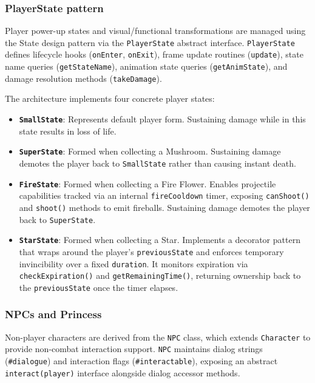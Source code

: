 \documentclass[12pt, a4paper]{article}
\begin{document}
\subsubsection{PlayerState pattern}

Player power-up states and visual/functional transformations are managed using the State design pattern via the \texttt{PlayerState} abstract interface. \texttt{PlayerState} defines lifecycle hooks (\texttt{onEnter}, \texttt{onExit}), frame update routines (\texttt{update}), state name queries (\texttt{getStateName}), animation state queries (\texttt{getAnimState}), and damage resolution methods (\texttt{takeDamage}).

The architecture implements four concrete player states:
\begin{itemize}
\item \textbf{\texttt{SmallState}}: Represents default player form. Sustaining damage while in this state results in loss of life.
\item \textbf{\texttt{SuperState}}: Formed when collecting a Mushroom. Sustaining damage demotes the player back to \texttt{SmallState} rather than causing instant death.
\item \textbf{\texttt{FireState}}: Formed when collecting a Fire Flower. Enables projectile capabilities tracked via an internal \texttt{fireCooldown} timer, exposing \texttt{canShoot()} and \texttt{shoot()} methods to emit fireballs. Sustaining damage demotes the player back to \texttt{SuperState}.
\item \textbf{\texttt{StarState}}: Formed when collecting a Star. Implements a decorator pattern that wraps around the player's \texttt{previousState} and enforces temporary invincibility over a fixed \texttt{duration}. It monitors expiration via \texttt{checkExpiration()} and \texttt{getRemainingTime()}, returning ownership back to the \texttt{previousState} once the timer elapses.
\end{itemize}

\newpage

\subsubsection{NPCs and Princess}

Non-player characters are derived from the \texttt{NPC} class, which extends \texttt{Character} to provide non-combat interaction support. \texttt{NPC} maintains dialog strings (\texttt{\#dialogue}) and interaction flags (\texttt{\#interactable}), exposing an abstract \texttt{interact(player)} interface alongside dialog accessor methods.
\end{document}
